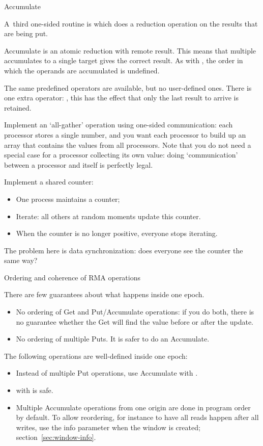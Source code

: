  {Accumulate}

A~third one-sided routine
is  which does a reduction operation on the results
that are being put.

Accumulate is an atomic reduction with remote result.
This means that multiple accumulates to a single target
gives the correct result.
As with , the 
order in which the operands are accumulated is undefined.

The same predefined operators are available, but no
user-defined ones. There is one extra operator: ,
this has the effect that only the last result to arrive is retained.

\begin{exercise}
  Implement an `all-gather' operation using one-sided communication:
  each processor stores a single number, and you want each processor
  to build up an array that contains the values from all
  processors. Note that you do not need a special case for a processor
  collecting its own value: doing `communication' between a processor
  and itself is perfectly legal.
\end{exercise}

\begin{exercise}
  \label{ex:countdown}

  Implement a shared counter:
  \begin{itemize}
  \item One process maintains a counter;
  \item Iterate: all others at random moments update this counter.
  \item When the counter is no longer positive, everyone stops iterating.
  \end{itemize}
  The problem here is data synchronization: does everyone see the
  counter the same way?
\end{exercise}

 {Ordering and coherence of RMA operations}

There are few guarantees about what happens inside one epoch.
\begin{itemize}
\item No ordering of Get and Put/Accumulate operations: if you do
  both, there is no guarantee whether the Get will find the value
  before or after the update.
\item No ordering of multiple Puts. It is safer to do an Accumulate.
\end{itemize}
The following operations are well-defined inside one epoch:
\begin{itemize}
\item Instead of multiple Put operations, use Accumulate with
  .
\item {} with
   is safe.
\item Multiple Accumulate operations from one origin are done in
  program order by default. To allow reordering, for instance to have
  all reads happen after all writes, use the info parameter
  when the window is created; section~\ref{sec:window-info}.
\end{itemize}

